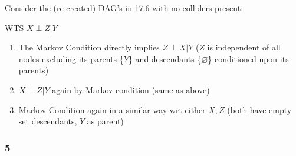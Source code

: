 \documentclass[11pt]{article}
\begin{document}
Consider the (re-created) DAG's in 17.6 with no colliders present: 

\begin{figure}[h]
\centering 
{}
\end{figure}

\begin{figure}[h]
\centering 
{}
\end{figure}

\begin{figure}[h]
\centering 
{}
\end{figure}

WTS $X \perp Z|Y$

\begin{enumerate}
    \item The Markov Condition directly implies $Z \perp X | Y$ ($Z$ is independent of all nodes excluding its parents \{$Y$\} and descendants \{$\varnothing$\} conditioned upon its parents)
    \item $X \perp Z |Y$ again by Markov condition (same as above)
    \item Markov Condition again in a similar way wrt either $X,Z$ (both have empty set descendants, $Y$ as parent) 
\end{enumerate}

\subsubsection{5}

\begin{figure}[H]
\centering 
{}
\end{figure}
\end{document}
